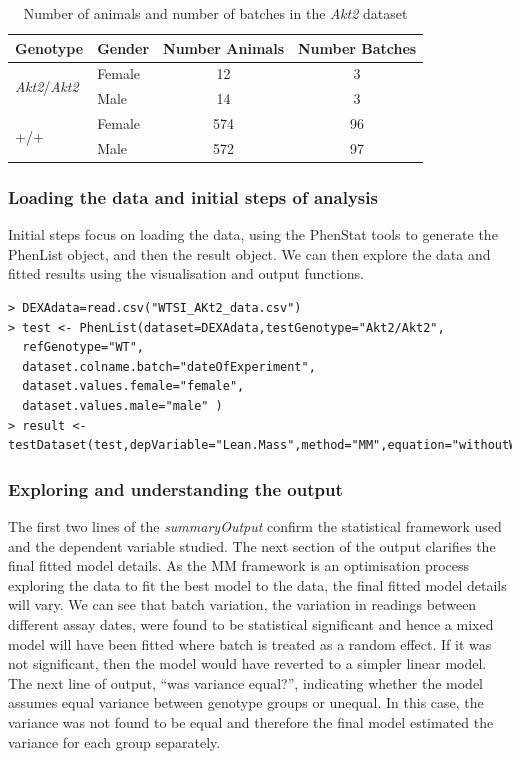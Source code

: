 \documentclass[12pt,a4paper]{article}
\begin{document}
\begin{table}[!h]
\begin{center}
\begin{tabular}{| l | l | c | c |}
  \hline
Genotype&Gender&Number Animals&Number Batches\\\hline
\multirow{2}{*}{\textit{Akt2}\slash \textit{Akt2}}&Female&12&3\\
			    &Male&14&3\\
			    \hline
\multirow{2}{*}{+\slash +}&Female&574&96\\
			    &Male&572&97\\

\hline  
\end{tabular}
\caption{Number of animals and number of batches in the \textit{Akt2} dataset}\label{table:08}
\end{center}
\end{table}

\subsubsection{Loading the data and initial steps of analysis}
Initial steps focus on loading the data, using the PhenStat tools to generate the PhenList object, and then the result object.  
We can then explore the data and fitted results using the visualisation and output functions.   
\begingroup
    \fontsize{8pt}{12pt}\selectfont
\begin{verbatim}
> DEXAdata=read.csv("WTSI_AKt2_data.csv")
> test <- PhenList(dataset=DEXAdata,testGenotype="Akt2/Akt2",  
  refGenotype="WT",
  dataset.colname.batch="dateOfExperiment", 
  dataset.values.female="female", 
  dataset.values.male="male" )
> result <- testDataset(test,depVariable="Lean.Mass",method="MM",equation="withoutWeight")
\end{verbatim}
\endgroup 



\subsubsection{Exploring and understanding the output}
\label{cs1_output}
The first two lines of the \textit{summaryOutput} confirm the statistical framework used and the dependent variable studied.   
The next section of the output clarifies the final fitted model details. As the MM framework is an optimisation process exploring the data to fit the best model to the data, 
the final fitted model details will vary. We can see that batch variation, the variation in readings between different assay dates, 
were found to be statistical significant and hence a mixed model will have been fitted where batch is treated as a random effect.  
If it was not significant, then the model would have reverted to a simpler linear model.  
The next line of output, “was variance equal?”, indicating whether the model assumes equal variance between genotype groups or unequal.  
In this case, the variance was not found to be equal and therefore the final model estimated the variance for each group separately. 
\end{document}
